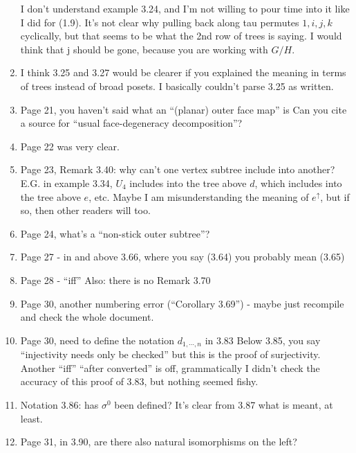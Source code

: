 \documentclass{article}
\begin{document}
\begin{enumerate}
	I don't understand example 3.24, and I'm not willing to pour time into it like I did for (1.9). It's not clear why pulling back along tau permutes $1,i,j,k$ cyclically, but that seems to be what the 2nd row of trees is saying. I would think that j should be gone, because you are working with $G/H$.
	
	
	\item
	I think 3.25 and 3.27 would be clearer if you explained the meaning in terms of trees instead of broad posets. I basically couldn't parse 3.25 as written. 
	
	\item
	Page 21, you haven't said what an ``(planar) outer face map'' is
	Can you cite a source for ``usual face-degeneracy decomposition''?
	
	\item
	Page 22 was very clear.
	
	\item
	Page 23, Remark 3.40: why can't one vertex subtree include into another? E.G. in example 3.34, $U_4$ includes into the tree above $d$, which includes into the tree above $e$, etc. Maybe I am misunderstanding the meaning of $e^\uparrow$, but if so, then other readers will too.
	
	
	\item
	Page 24, what's a ``non-stick outer subtree''?
	
	\item
	Page 27 - in and above 3.66, where you say (3.64) you probably mean (3.65)
	
	\item
	Page 28 - ``iff''
	Also: there is no Remark 3.70
	
	\item
	Page 30, another numbering error (``Corollary 3.69'') - maybe just recompile and check the whole document.
	
	\item
	Page 30, need to define the notation $d_{1,\cdots,n}$ in 3.83
	Below 3.85, you say ``injectivity needs only be checked'' but this is the proof of surjectivity.
	Another ``iff''
	``after converted'' is off, grammatically
	I didn't check the accuracy of this proof of 3.83, but nothing seemed fishy.
	
	\item
	Notation 3.86: has $\sigma^0$ been defined?
	It's clear from 3.87 what is meant, at least.
	
	\item
	Page 31, in 3.90, are there also natural isomorphisms on the left?
	

\end{enumerate}
\end{document}
